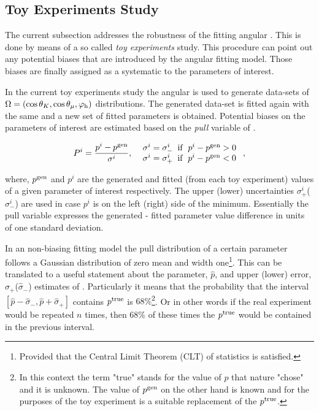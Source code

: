 \subsection{Toy Experiments Study}
\label{Toy_Experiments_Study}

The current subsection addresses the robustness of the fitting angular \pdf.
This is done by means of a so called {\it toy experiments} study. This procedure
can point out any potential biases that are introduced by the angular fitting model.
Those biases are finally assigned as a systematic to the parameters of interest.

In the current toy experiments study the angular \pdf is used to generate data-sets of $\Omega = (\cos\theta_{K},\cos\theta_{\mu},{\varphi_{\text h}})$
distributions. The generated data-set is fitted again with the same \pdf and a new set of fitted parameters is obtained. Potential
biases on the parameters of interest are estimated based on the {\it pull} variable of .

\begin{equation}
P^i = \frac{p^i - p^{\rm gen}}{ \sigma^i },\;\;\left.
  \begin{array}{ll}
    \sigma^i = \sigma^i_- \;\;{\rm if}\;\; p^i - p^{\rm gen} > 0   \\
    \sigma^i = \sigma^i_+ \;\;{\rm if}\;\; p^i - p^{\rm gen} < 0
  \end{array} \right. ,
\label{pull_def}
\end{equation}

\noindent where, $p^{\rm gen}$ and $p^i$ are the generated and fitted (from each toy experiment) values of a given parameter of interest
respectively. The upper (lower) uncertainties $\sigma^i_+$($\sigma^i_-$) are used in case $p^i$ is on the left (right) side of the minimum.
Essentially the pull variable expresses the generated - fitted parameter value difference in units of one standard deviation.

In an non-biasing fitting model the pull distribution of a certain parameter follows a Gaussian distribution of zero mean and width
one\footnote{Provided that the Central Limit Theorem (CLT) of statistics is satisfied.}.
This can be translated to a useful statement about the parameter, $\hat{p}$, and upper (lower) error, $\hat{\sigma}_+$($\hat{\sigma}_-$)
estimates of . Particularly it means that the probability that the interval
$[\hat{p}-\hat{\sigma}_-,\hat{p}+\hat{\sigma}_+]$ contains $p^{\rm true}$ is $68\%$\footnote{In this context the term "true" stands for the
value of $p$ that nature "chose" and it is unknown. The value of $p^{\rm gen}$ on the other hand is known and for the purposes of
the toy experiment is a suitable replacement of the $p^{\rm true}$.}. Or in other words if the real experiment would be repeated
$n$ times, then $68\%$ of these times the $p^{\rm true}$ would be contained in the previous interval.

